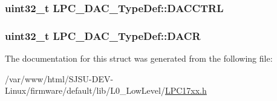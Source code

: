 \subsubsection[{\texorpdfstring{D\+A\+C\+C\+T\+RL}{DACCTRL}}]{ uint32\+\_\+t L\+P\+C\+\_\+\+D\+A\+C\+\_\+\+Type\+Def\+::\+D\+A\+C\+C\+T\+RL}\hypertarget{structLPC__DAC__TypeDef_a98d077f22452e939c5393ba58460165d}{}\label{structLPC__DAC__TypeDef_a98d077f22452e939c5393ba58460165d}
\subsubsection[{\texorpdfstring{D\+A\+CR}{DACR}}]{ uint32\+\_\+t L\+P\+C\+\_\+\+D\+A\+C\+\_\+\+Type\+Def\+::\+D\+A\+CR}\hypertarget{structLPC__DAC__TypeDef_aeca5925957d02f483828953f108d8472}{}\label{structLPC__DAC__TypeDef_aeca5925957d02f483828953f108d8472}


The documentation for this struct was generated from the following file\+:\begin{DoxyCompactItemize}
\item 
/var/www/html/\+S\+J\+S\+U-\/\+D\+E\+V-\/\+Linux/firmware/default/lib/\+L0\+\_\+\+Low\+Level/\hyperlink{LPC17xx_8h}{L\+P\+C17xx.\+h}\end{DoxyCompactItemize}
